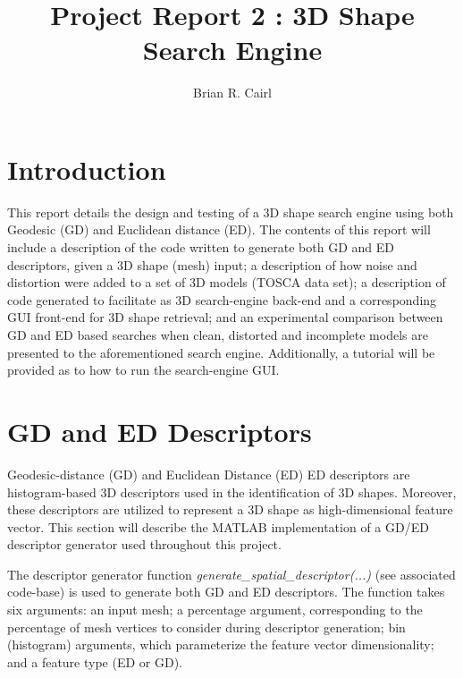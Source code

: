 \documentclass[12pt]{article}
\title{Project Report 2 : 3D Shape Search Engine}
\author{Brian R. Cairl}
\begin{document}
\maketitle
\pagebreak

\newcommand{\ith}{i$^{th}$}
\newcommand{\jth}{j$^{th}$}
\newcommand{\st}{\hspace{0.5mm}:\hspace{0.5mm}}
\newcommand{\fa}{\hspace{0.5mm}\forall\hspace{0.5mm}}


\section*{Introduction}

	\noindent	
	This report details the design and testing of a 3D shape search engine using both Geodesic (GD) and Euclidean distance (ED). The contents of this report will include a description of the code written to generate both GD and ED descriptors, given a 3D shape (mesh) input; a description of how noise and distortion were added to a set of 3D models (TOSCA data set); a description of code generated to facilitate as 3D search-engine back-end and a corresponding GUI front-end for 3D shape retrieval; and an experimental comparison between GD and ED based searches when clean, distorted and incomplete models are presented to the aforementioned search engine. Additionally, a tutorial will be provided as to how to run the search-engine GUI.


\section*{GD and ED Descriptors}
	
	\noindent
	Geodesic-distance (GD) and Euclidean Distance (ED) ED descriptors are histogram-based 3D descriptors used in the identification of 3D shapes. Moreover, these descriptors are utilized to represent a 3D shape as high-dimensional feature vector. This section will describe the MATLAB implementation of a GD/ED descriptor generator used throughout this project.

	\noindent
	The descriptor generator function \emph{generate\_spatial\_descriptor(...)} (see associated code-base) is used to generate both GD and ED descriptors. The function takes six arguments: an input mesh; a percentage argument, corresponding to the percentage of mesh vertices to consider during descriptor generation; bin (histogram) arguments, which parameterize the feature vector dimensionality; and a feature type (ED or GD). 
\end{document}
